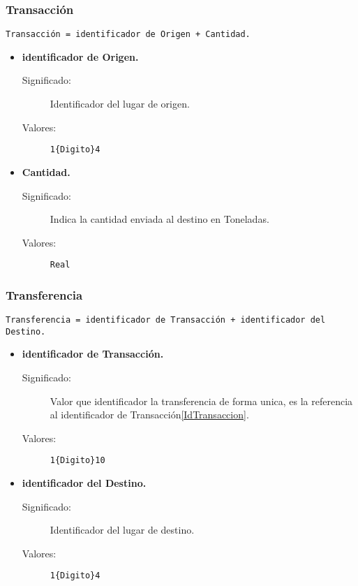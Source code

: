 \subsubsection{Transacción}\label{Datos_Transaccion}
\begin{lstlisting}
Transacción = identificador de Origen + Cantidad.
\end{lstlisting}
	\begin{itemize}
		\item \textbf{identificador de Origen.}
			\begin{description}
				\item [Significado:] Identificador del lugar de origen.
				\item [Valores:]{\begin{lstlisting}
1{Digito}4\end{lstlisting}}
			\end{description}
		\item \textbf{Cantidad.}
			\begin{description}
				\item [Significado:] Indica la cantidad enviada al destino en Toneladas.
				\item [Valores:]{\begin{lstlisting}
Real\end{lstlisting}}
			\end{description}
	\end{itemize}
		
\subsubsection{Transferencia}
\begin{lstlisting}
Transferencia = identificador de Transacción + identificador del Destino.
\end{lstlisting}
\lstset{breaklines=true}
	\begin{itemize}
		\item \textbf{identificador de Transacción.}
			\begin{description}
				\item [Significado:] Valor que identificador la transferencia de forma unica, es la referencia al identificador de Transacción\ref{IdTransaccion}.
				\item [Valores:]{\begin{lstlisting}
1{Digito}10\end{lstlisting}}
			\end{description}

		\item \textbf{identificador del Destino.}
			\begin{description}
				\item [Significado:] Identificador del lugar de destino.
				\item [Valores:]{\begin{lstlisting}
1{Digito}4\end{lstlisting}}
			\end{description}
	\end{itemize}

